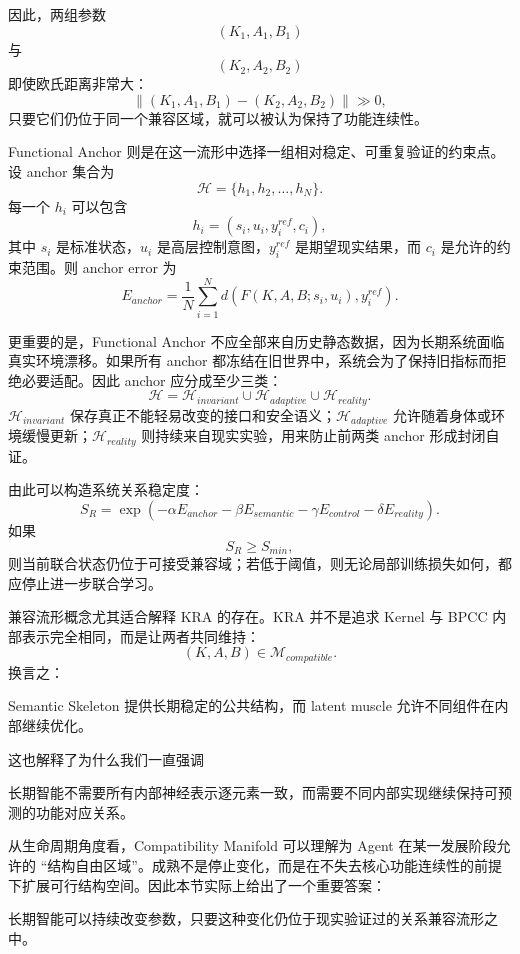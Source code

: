 因此，两组参数
\[
(K_1,A_1,B_1)
\]
与
\[
(K_2,A_2,B_2)
\]
即使欧氏距离非常大：
\[
\left\|
(K_1,A_1,B_1)
-
(K_2,A_2,B_2)
\right\|
\gg 0,
\]
只要它们仍位于同一个兼容区域，就可以被认为保持了功能连续性。

Functional Anchor 则是在这一流形中选择一组相对稳定、可重复验证的约束点。设 anchor 集合为
\[
\mathcal H
=
\{h_1,h_2,\ldots,h_N\}.
\]
每一个 $h_i$ 可以包含
\[
h_i
=
(s_i,u_i,y_i^{ref},c_i),
\]
其中 $s_i$ 是标准状态，$u_i$ 是高层控制意图，$y_i^{ref}$ 是期望现实结果，而 $c_i$ 是允许的约束范围。则 anchor error 为
\[
E_{anchor}
=
\frac{1}{N}
\sum_{i=1}^{N}
d
\left(
F(K,A,B;s_i,u_i),
y_i^{ref}
\right).
\]

更重要的是，Functional Anchor 不应全部来自历史静态数据，因为长期系统面临真实环境漂移。如果所有 anchor 都冻结在旧世界中，系统会为了保持旧指标而拒绝必要适配。因此 anchor 应分成至少三类：
\[
\mathcal H
=
\mathcal H_{invariant}
\cup
\mathcal H_{adaptive}
\cup
\mathcal H_{reality}.
\]
$\mathcal H_{invariant}$ 保存真正不能轻易改变的接口和安全语义；$\mathcal H_{adaptive}$ 允许随着身体或环境缓慢更新；$\mathcal H_{reality}$ 则持续来自现实实验，用来防止前两类 anchor 形成封闭自证。

由此可以构造系统关系稳定度：
\[
S_R
=
\exp
\left(
-
\alpha E_{anchor}
-
\beta E_{semantic}
-
\gamma E_{control}
-
\delta E_{reality}
\right).
\]
如果
\[
S_R\geq S_{min},
\]
则当前联合状态仍位于可接受兼容域；若低于阈值，则无论局部训练损失如何，都应停止进一步联合学习。

兼容流形概念尤其适合解释 KRA 的存在。KRA 并不是追求 Kernel 与 BPCC 内部表示完全相同，而是让两者共同维持：
\[
(K,A,B)\in\mathcal M_{compatible}.
\]
换言之：
\begin{statementbox}
\centering
{}
\end{statementbox}
Semantic Skeleton 提供长期稳定的公共结构，而 latent muscle 允许不同组件在内部继续优化。

这也解释了为什么我们一直强调
\begin{statementbox}
\centering
{}
\end{statementbox}
长期智能不需要所有内部神经表示逐元素一致，而需要不同内部实现继续保持可预测的功能对应关系。

从生命周期角度看，Compatibility Manifold 可以理解为 Agent 在某一发展阶段允许的 ``结构自由区域''。成熟不是停止变化，而是在不失去核心功能连续性的前提下扩展可行结构空间。因此本节实际上给出了一个重要答案：
\begin{statementbox}
长期智能可以持续改变参数，只要这种变化仍位于现实验证过的关系兼容流形之中。
\end{statementbox}

